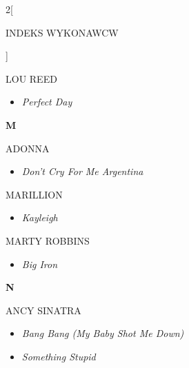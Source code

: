 \documentclass[a4paper]{report}
\begin{document}
\begin{multicols*}{2}[\begin{Huge}INDEKS WYKONAWCW\end{Huge}\vspace{1cm}]
\begin{minipage}{\columnwidth}
	LOU REED 
	\begin{itemize}[topsep=3pt, after=\vspace{3mm}]
		\itemsep0em
		\item[]\textit{Perfect Day}  \\
	\end{itemize}
\end{minipage}
\begin{minipage}{\columnwidth}
	\begin{Large}\textbf{M}\end{Large}ADONNA 
	\begin{itemize}[topsep=3pt, after=\vspace{3mm}]
		\itemsep0em
		\item[]\textit{Don't Cry For Me Argentina}  \\
	\end{itemize}
\end{minipage}
\begin{minipage}{\columnwidth}
	MARILLION 
	\begin{itemize}[topsep=3pt, after=\vspace{3mm}]
		\itemsep0em
		\item[]\textit{Kayleigh}  \\
	\end{itemize}
\end{minipage}
\begin{minipage}{\columnwidth}
	MARTY ROBBINS 
	\begin{itemize}[topsep=3pt, after=\vspace{3mm}]
		\itemsep0em
		\item[]\textit{Big Iron}  \\
	\end{itemize}
\end{minipage}
\begin{minipage}{\columnwidth}
	\begin{Large}\textbf{N}\end{Large}ANCY SINATRA 
	\begin{itemize}[topsep=3pt, after=\vspace{3mm}]
		\itemsep0em
		\item[]\textit{Bang Bang (My Baby Shot Me Down)}  \\
		\item[]  \textit{Something Stupid}  \\
	\end{itemize}

\end{minipage}
\end{multicols*}
\end{document}
